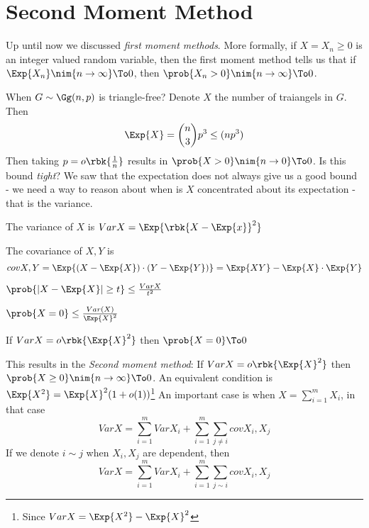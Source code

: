 \documentclass[a4paper, 11pt, oneside]{book}
\begin{document}
\chapter{Second Moment Method}
Up until now we discussed \emph{first moment methods}. More formally, if $X = X_n\ge 0$ is an integer valued random variable, then the first moment method tells us that if $\Exp{X_n}\nim{n\to \infty}\To 0$, then $\prob{X_n>0}\nim{n\to\infty}\To 0$. 
\begin{example}
	 When $G\sim \Gg(n,p)$ is triangle-free? Denote $X$ the number of traiangels in $G$. Then
	\[
	\Exp{X} = {n\choose 3}p^3\le (np^3)
	\]
	Then taking $p = o\rbk{\frac{1}{n}}$ results in $\prob{X > 0}\nim{n\to 0}\To 0$. Is this bound \emph{tight}? We saw that the expectation does not always give us a good bound - we need a way to reason about when is $X$ concentrated about its expectation - that is the variance.
\end{example}
\begin{yellowBox}
\begin{defn}
	[Variance] The variance of $X$ is $Var{X} = \Exp{\rbk{X-\Exp{x}}^2}$
\end{defn}	
\begin{defn}
	[Covariance] The covariance of $X,Y$ is $$cov{X,Y} = \Exp{(X-\Exp{X})\cdot(Y-\Exp{Y})} = \Exp{XY} - \Exp{X}\cdot\Exp{Y}$$
\end{defn}
\begin{thm}
	[Chebyshev]\label{thm:Chebyshev ineq} $\prob{|X-\Exp{X}|\ge t}\le \frac{Var{X}}{t^2}$
\end{thm}
\begin{cor}
	$\prob{X = 0}\le \frac{Var(X)}{\Exp{X}^2}$
\end{cor}
\begin{cor}
If $Var{X} = o\rbk{\Exp{X}^2	}$ then $\prob{X=0}\To 0$
\end{cor}

\end{yellowBox}
This results in the \emph{Second moment method}: If $Var{X} = o\rbk{\Exp{X}^2}$ then $\prob{X\ge 0}\nim{n\to\infty}\To 0$. An equivalent condition is $\Exp{X^2} = \Exp{X}^2(1+o(1))$\footnote{Since $Var{X} = \Exp{X^2} - \Exp{
X}^2$}
An important case is when $X = \sum_{i=1}^mX_i$, in that case \[
Var{X} = \sum_{i=1}^m Var{X_i} + \sum_{i=1}^m\sum_{j\neq i}cov{X_i,X_j}
\]
If we denote $i\sim j$ when $X_i,X_j$ are dependent, then
\[
Var{X} = \sum_{i=1}^m Var{X_i} + \sum_{i=1}^m\sum_{j\sim i}cov{X_i,X_j}
\]
\end{document}
